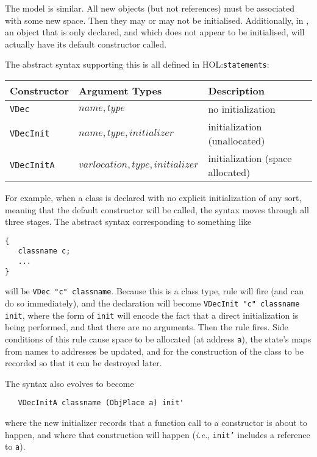 \documentclass[11pt]{article}
\newcommand{\ie}{\emph{i.e.}}
\newcommand{\HOLfile}[1]{HOL:\texttt{#1}}
\begin{document}
The \cpp{} model is similar.  All new objects (but not references)
must be associated with some new space.  Then they may or may not be
initialised.  Additionally, in \cpp{}, an object that is only
declared, and which does not appear to be initialised, will actually
have its default constructor called.

The abstract syntax supporting this is all defined in
\HOLfile{statements}:

\begin{center}
\begin{tabular}{lll}
Constructor & Argument Types & Description\\
\hline
\texttt{VDec} & $\mathit{name},\mathit{type}$ & no initialization\\
\texttt{VDecInit} &
$\mathit{name},\mathit{type},\mathit{initializer}$ &
initialization (unallocated) \\
\texttt{VDecInitA} &
$\mathit{varlocation},\mathit{type},\mathit{initializer}$ &
initialization (space allocated)
\end{tabular}
\end{center}

For example, when a class is declared with no explicit initialization
of any sort, meaning that the default constructor will be called, the
syntax moves through all three stages.  The abstract syntax
corresponding to something like
\begin{verbatim}
{
   classname c;
   ...
}
\end{verbatim}
will be \texttt{VDec "c" classname}.  Because this is a class type,
rule  will fire (and can do so immediately),
and the declaration will become \texttt{VDecInit "c" classname init},
where the form of \texttt{init} will encode the fact that a direct
initialization is being performed, and that there are no arguments.
Then the rule 
fires.  Side conditions of this rule cause space to be allocated (at
address \texttt{a}), the state's maps from names to addresses be
updated, and for the construction of the class to be recorded so that
it can be destroyed later.

The syntax also evolves to become
\begin{verbatim}
   VDecInitA classname (ObjPlace a) init'
\end{verbatim}
where the new initializer records that a function call to a
constructor is about to happen, and where that construction will
happen (\ie, \texttt{init'} includes a reference to \texttt{a}).
\end{document}
